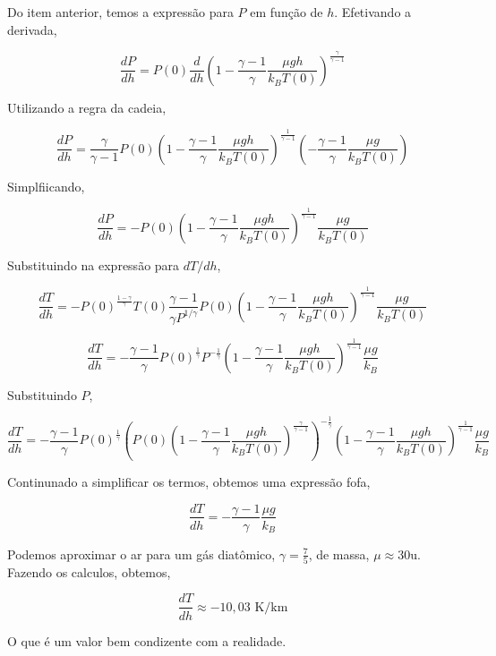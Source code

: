 \documentclass[11pt]{article}
\begin{document}
\begin{pproblem}
\begin{pssolution*}{}{}
\begin{alternativas}
        Do item anterior, temos a expressão para \(P\) em função de \(h\). Efetivando a derivada, 

        \[\frac{dP}{dh} = P(0)\frac{d}{dh}\left(1-\frac{\gamma-1}{\gamma}\frac{\mu g h}{k_B T(0)}\right)^{\frac{\gamma}{\gamma-1}}\]

        Utilizando a regra da cadeia, 

        \[\frac{dP}{dh} = \frac{\gamma}{\gamma-1}P(0)\left(1-\frac{\gamma-1}{\gamma}\frac{\mu g h}{k_B T(0)}\right)^{\frac{1}{\gamma-1}}\left(-\frac{\gamma-1}{\gamma}\frac{\mu g}{k_B T(0)}\right)\]

        Simplfiicando, 

        \[\frac{dP}{dh} = -P(0)\left(1-\frac{\gamma-1}{\gamma}\frac{\mu g h}{k_B T(0)}\right)^{\frac{1}{\gamma-1}}\frac{\mu g}{k_B T(0)}\]

        Substituindo na expressão para \(dT/dh\), 

        \[\frac{dT}{dh} = -P(0)^\frac{1-\gamma}{\gamma}T(0) \frac{\gamma-1}{\gamma P^{1/\gamma}}P(0)\left(1-\frac{\gamma-1}{\gamma}\frac{\mu g h}{k_B T(0)}\right)^{\frac{1}{\gamma-1}}\frac{\mu g}{k_B T(0)}\]

        \[\frac{dT}{dh} = -\frac{\gamma-1}{\gamma}P(0)^\frac{1}{\gamma} P^{-\frac{1}{\gamma}}\left(1-\frac{\gamma-1}{\gamma}\frac{\mu g h}{k_B T(0)}\right)^{\frac{1}{\gamma-1}}\frac{\mu g}{k_B}\]

        Substituindo \(P\), 

        \[\frac{dT}{dh} = -\frac{\gamma-1}{\gamma}P(0)^\frac{1}{\gamma} \left(P(0)\left(1-\frac{\gamma-1}{\gamma}\frac{\mu g h}{k_B T(0)}\right)^{\frac{\gamma}{\gamma-1}}\right)^{-\frac{1}{\gamma}}\left(1-\frac{\gamma-1}{\gamma}\frac{\mu g h}{k_B T(0)}\right)^{\frac{1}{\gamma-1}}\frac{\mu g}{k_B}\]

        Continunado a simplificar os termos, obtemos uma expressão fofa, 

        \[\frac{dT}{dh} = -\frac{\gamma-1}{\gamma}\frac{\mu g}{k_B}\]

        Podemos aproximar o ar para um gás diatômico, \(\gamma = \frac{7}{5}\), de massa, \(\mu\approx 30\)u. Fazendo os calculos, obtemos, 

        \[\boxed{\frac{dT}{dh} \approx - 10,03 \text{ K/km}}\]

        O que é um valor bem condizente com a realidade.
    \end{alternativas}
\end{pssolution*}
\end{pproblem}
\end{document}
